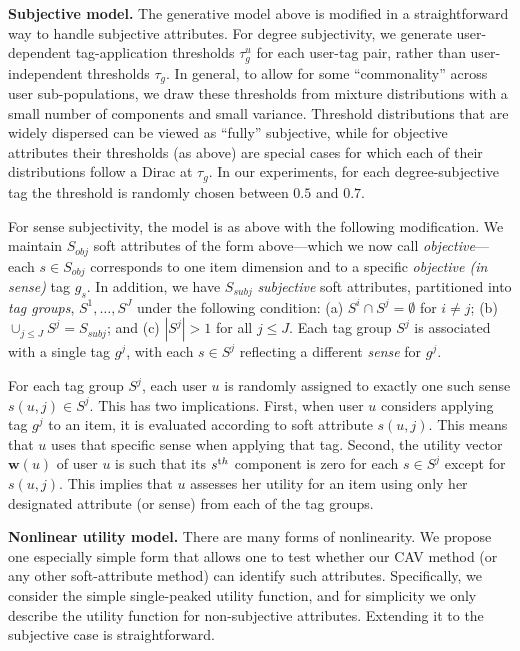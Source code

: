 \documentclass[manuscript,screen,nonacm]{acmart}
\newcommand{\1}{{\mathbf 1}}
\newcommand{\bfw}{\mathbf{w}}
\newcommand{\obj}{\mathit{obj}}
\newcommand{\subj}{\mathit{subj}}
\theoremstyle{TheoremNum}
\begin{document}
\vskip 2mm
\noindent
\textbf{Subjective model.} \hspace*{2mm}
The generative model above is modified in a straightforward way to handle subjective attributes. For degree subjectivity, we generate user-dependent tag-application thresholds $\tau^u_g$ for each user-tag pair, rather than user-independent thresholds $\tau_g$. In general, to allow for some ``commonality'' across user sub-populations, we draw these thresholds from mixture distributions with a small number of components and small variance.  Threshold distributions that are widely dispersed can be viewed as ``fully'' subjective, while for objective attributes their thresholds (as above) are special cases for which each of their distributions follow a Dirac at $\tau_g$. In our experiments, for each degree-subjective tag the threshold is randomly chosen between $0.5$ and $0.7$.

For sense subjectivity, the model is as above with the following modification. We maintain $S_{\obj}$ soft attributes of the form above---which we now call \emph{objective}---each $s\in S_{\obj}$ corresponds to one item dimension and to a specific \emph{objective (in sense)} tag $g_s$. In addition, we have $S_{\subj}$ \emph{subjective} soft attributes, partitioned into \emph{tag groups}, $S^1, \ldots, S^J$ under the following condition: (a) $S^i \cap S^j =\emptyset$ for $i\neq j$; (b) $\cup_{j\leq J} S^j = S_\subj$; and (c) $|S^j| > 1$ for all $j\leq J$. Each tag group $S^j$ is associated with a single tag $g^j$, with each $s\in S^j$ reflecting a different \emph{sense} for $g^j$.

For each tag group $S^j$, each user $u$ is randomly assigned to exactly one such sense $s(u,j) \in S^j$. This has two implications. First, when user $u$ considers applying tag $g^j$ to an item, it is evaluated according to soft attribute $s(u,j)$. This means that $u$ uses that specific sense when applying that tag. Second, the utility vector $\bfw(u)$ of user $u$ is such that its
$s^{\textrm th}$ component is zero for each $s\in S^j$ except for $s(u,j)$. This implies that $u$ assesses her utility for an item using only her designated attribute (or sense) from each of the tag groups.

\vskip 2mm
\noindent
\textbf{Nonlinear utility model.} \hspace*{2mm}
There are many forms of nonlinearity. We propose one especially simple form that allows one to test whether our CAV method (or any other soft-attribute method) can identify such attributes. Specifically, we consider the simple single-peaked utility function, and for simplicity we only describe the  utility function for non-subjective attributes. Extending it to the subjective case is straightforward. 
\end{document}
